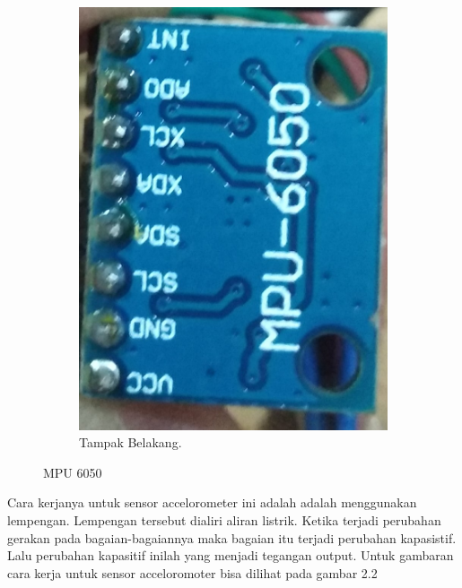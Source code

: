 \documentclass[11pt]{article}
\numberwithin{equation}{subsection}
\begin{document}
\begin{figure}[h!]
\begin{subfigure}[b]{0.35\linewidth}
		\includegraphics[width=\linewidth]{dokumentasi/MPU6050/mpu60501_1.jpg}
		\caption{Tampak Belakang.}
	\end{subfigure}
	\caption{MPU 6050}
	\label{fig:MPU 6050}
\end{figure}
Cara kerjanya untuk sensor accelorometer ini adalah  adalah menggunakan lempengan.
Lempengan tersebut dialiri aliran listrik.
Ketika terjadi perubahan gerakan pada bagaian-bagaiannya maka bagaian itu terjadi perubahan kapasistif.
Lalu perubahan kapasitif inilah yang menjadi tegangan output.
Untuk gambaran cara kerja untuk sensor acceloromoter bisa dilihat pada gambar 2.2
\end{document}
